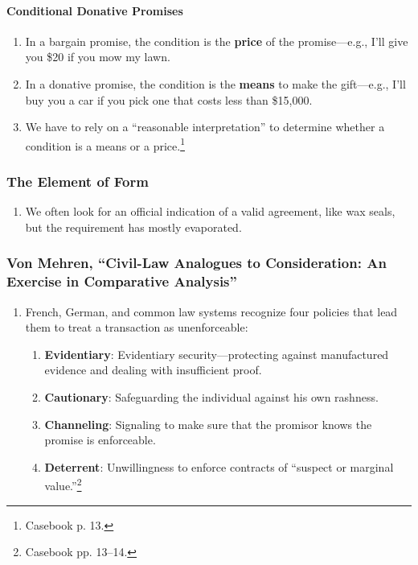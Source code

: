 \paragraph{Conditional Donative Promises}

\begin{enumerate}
    \item In a bargain promise, the condition is the \textbf{price} of the 
    promise---e.g., I'll give you \$20 if you mow my lawn.
    \item In a donative promise, the condition is the \textbf{means} to make 
    the gift---e.g., I'll buy you a car if you pick one that costs less than 
    \$15,000. 
    \item We have to rely on a ``reasonable interpretation'' to determine 
    whether a condition is a means or a price.\footnote{Casebook p. 13.}
\end{enumerate}

\subsubsection{The Element of Form}

\begin{enumerate}
    \item We often look for an official indication of a valid 
    agreement, like wax seals, but the requirement has mostly evaporated.
\end{enumerate}

\subsubsection{Von Mehren, ``Civil-Law Analogues to Consideration: An Exercise 
in Comparative Analysis''}

\begin{enumerate}
    \item French, German, and common law systems recognize four policies that 
    lead them to treat a transaction as unenforceable:
    \begin{enumerate}
        \item \textbf{Evidentiary}: Evidentiary security---protecting against 
        manufactured evidence and dealing with insufficient proof.
        \item \textbf{Cautionary}: Safeguarding the individual against his own 
        rashness.
        \item \textbf{Channeling}: Signaling to make sure that the promisor 
        knows the promise is enforceable.
        \item \textbf{Deterrent}: Unwillingness to enforce contracts of 
        ``suspect or marginal value.''\footnote{Casebook pp. 13--14.}
    \end{enumerate}
\end{enumerate}

